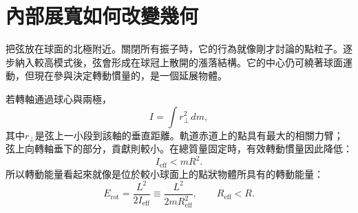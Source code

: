 \section{內部展寬如何改變幾何}

把弦放在球面的北極附近。關閉所有振子時，它的行為就像剛才討論的點粒子。逐步納入較高模式後，弦會形成在球冠上散開的漲落結構。它的中心仍可繞著球面運動，但現在參與決定轉動慣量的，是一個延展物體。

若轉軸通過球心與兩極，
\begin{equation}
  I=\int r_\perp^2\,dm,
  \label{eq:l09-extended-inertia}
\end{equation}
其中\(r_\perp\)是弦上一小段到該軸的垂直距離。軌道赤道上的點具有最大的相關力臂；弦上向轉軸垂下的部分，貢獻則較小。在總質量固定時，有效轉動慣量因此降低：
\begin{equation}
  I_{\mathrm{eff}}<mR^2.
  \label{eq:l09-inertia-reduction}
\end{equation}
所以轉動能量看起來就像是位於較小球面上的點狀物體所具有的轉動能量：
\begin{equation}
  E_{\mathrm{rot}}
  =\frac{L^2}{2I_{\mathrm{eff}}}
  \equiv \frac{L^2}{2mR_{\mathrm{eff}}^2},
  \qquad R_{\mathrm{eff}}<R.
  \label{eq:l09-effective-radius}
\end{equation}

\begin{classroomqa}
\end{classroomqa}

